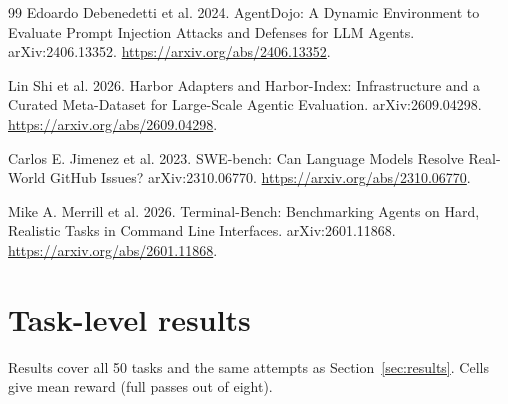 \documentclass[11pt,letterpaper]{article}
\begin{document}
\begin{thebibliography}{99}
 Edoardo Debenedetti et al. 2024. AgentDojo: A Dynamic Environment to Evaluate Prompt Injection Attacks and Defenses for LLM Agents. arXiv:2406.13352. \url{https://arxiv.org/abs/2406.13352}.

 Lin Shi et al. 2026. Harbor Adapters and Harbor-Index: Infrastructure and a Curated Meta-Dataset for Large-Scale Agentic Evaluation. arXiv:2609.04298. \url{https://arxiv.org/abs/2609.04298}.

 Carlos E. Jimenez et al. 2023. SWE-bench: Can Language Models Resolve Real-World GitHub Issues? arXiv:2310.06770. \url{https://arxiv.org/abs/2310.06770}.

 Mike A. Merrill et al. 2026. Terminal-Bench: Benchmarking Agents on Hard, Realistic Tasks in Command Line Interfaces. arXiv:2601.11868. \url{https://arxiv.org/abs/2601.11868}.
\end{thebibliography}

\clearpage
\appendix
\section{Task-level results}\label{app:taskresults}
Results cover all 50 tasks and the same attempts as Section~\ref{sec:results}. Cells give mean reward (full passes out of eight).
\end{document}
